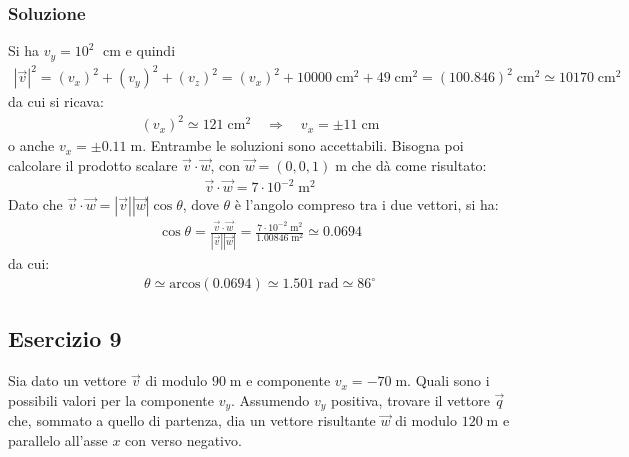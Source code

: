 \documentclass[12pt,a4paper]{book}
\begin{document}
\subsubsection*{Soluzione}
Si ha $v_y=10^2\;$ cm e quindi
\begin{gather*}
|\vec{v}|^2=(v_x)^2+(v_y)^2+(v_z)^2=(v_x)^2+10000 \; \text{cm}^2 + 49 \; \text{cm}^2=(100.846)^2  \; \text{cm}^2 \simeq 10170\; \text{cm}^2
\end{gather*}
da cui si ricava: 
\begin{gather*}
(v_x)^2 \simeq 121\; \text{cm}^2 \quad \Rightarrow \quad v_x=\pm 11\; \text{cm} 
\end{gather*}
o anche $v_x =\pm 0.11 \;$m. Entrambe le soluzioni sono accettabili. Bisogna poi calcolare il prodotto scalare $\vec{v}\cdot \vec{w}$, con $\vec{w}=(0,0,1)\;$m che dà come risultato:
\begin{gather*}
\vec{v}\cdot \vec{w}=7 \cdot 10^{-2} \; \text{m}^2
\end{gather*}
Dato che $\vec{v}\cdot \vec{w}=|\vec{v}||\vec{w}| \cos \theta$, dove $\theta$ è l'angolo compreso tra i due vettori, si ha:
\begin{gather*}
\cos \theta=\frac{\vec{v}\cdot \vec{w}}{|\vec{v}||\vec{w}|}=\frac{7 \cdot 10^{-2} \; \text{m}^2}{1.00846 \; \text{m}^2}\simeq 0.0694
\end{gather*}
da cui: 
\begin{gather*}
\theta \simeq \text{arcos}(0.0694) \simeq 1.501 \; \text{rad} \simeq 86^{\circ}
\end{gather*}

\subsection*{Esercizio 9}
Sia dato un vettore $\vec{v}$ di modulo $90\;\text{m}$ e componente $v_x=-70\;\text{m}$. Quali sono i possibili valori per la componente $v_y$. Assumendo $v_y$ positiva, trovare il vettore $\vec{q}$ che, sommato a quello di partenza, dia un vettore risultante $\vec{w}$ di modulo $120\;\text{m}$ e parallelo all'asse $x$ con verso negativo.
\end{document}

